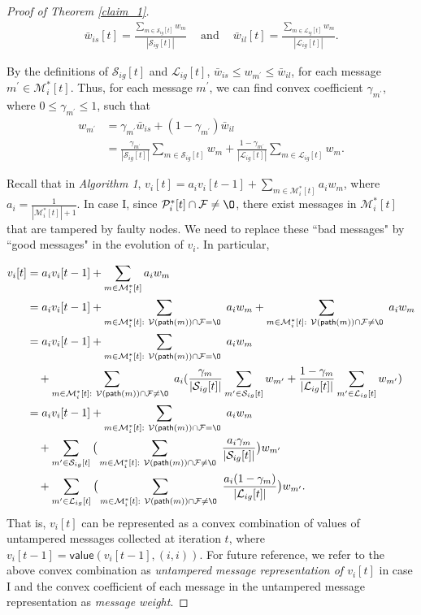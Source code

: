 \documentclass[letterpaper, 11pt]{article}
\newcommand{\calF}{{\mathcal{F}}}
\newcommand{\calL}{{\mathcal{L}}}
\newcommand{\calM}{{\mathcal{M}}}
\newcommand{\calP}{{\mathcal{P}}}
\newcommand{\calS}{{\mathcal{S}}}
\newcommand{\calV}{{\mathcal{V}}}
\begin{document}
\begin{proof}[Proof of Theorem \ref{claim_1}]
\begin{eqnarray}
\bar{w}_{is}[t]=\frac{\sum_{m\in \calS_{ig}[t]}w_{m}}{|\calS_{ig}[t]|} \quad ~ \text{and}~\quad
\bar{w}_{il}[t]=\frac{\sum_{m\in \calL_{ig}[t]}w_{m}}{|\calL_{ig}[t]|}.
\end{eqnarray}




By the definitions of $\calS_{ig}[t]$ and $\calL_{ig}[t]$, $\bar{w}_{is}\le w_{m^{\prime}}\le \bar{w}_{il}$, for each message $m^{\prime}\in \calM^*_i[t]$. Thus, for each message $m^{\prime}$, we can find convex coefficient $\gamma_{m^{\prime}}$, where $0\le \gamma_{m^{\prime}} \le 1$, such that
\begin{align*}
w_{m^{\prime}}&=\gamma_{m^{\prime}}\bar{w}_{is}+(1-\gamma_{m^{\prime}})\bar{w}_{il}\\
&=\frac{\gamma_{m^{\prime}}}{|\calS_{ig}[t]|}\sum_{m\in \calS_{ig}[t]}w_m+\frac{1-\gamma_{m^{\prime}}}{|\calL_{ig}[t]|}\sum_{m\in \calL_{ig}[t]}w_m.
\end{align*}

Recall that in \emph {Algorithm 1}, $v_i[t]=a_iv_i[t-1]+\sum_{m\in \calM_i^*[t]}a_iw_m$, where $a_i=\frac{1}{|\calM_i^*[t]|+1}$. In case I, since $\calP_i^{*}[t]\cap \calF\not=\O$, there exist messages in $\calM_i^{*}[t]$ that are tampered by faulty nodes. We need to replace these ``bad messages" by ``good messages" in the evolution of $v_i$. In particular,

\begin{align}
v_i[t]&=a_iv_i[t-1]+\sum_{m\in \calM_i^*[t]}a_iw_m\\
&=a_iv_i[t-1]+\sum_{m\in \calM_i^*[t]:~\calV(\mathsf{path}(m))\cap \calF=\O~}a_iw_m
+\sum_{m\in \calM_i^*[t]:~ \calV(\mathsf{path}(m))\cap \calF\not=\O~}a_iw_m\\
&=a_iv_i[t-1]+\sum_{m\in \calM_i^*[t]:~  \calV(\mathsf{path}(m))\cap \calF=\O~}a_iw_m\\
&\quad+\sum_{m\in \calM_i^*[t]:~\calV(\mathsf{path}(m))\cap \calF\not=\O~}a_i(\frac{\gamma_{m}}{|\calS_{ig}[t]|}\sum_{m^{\prime}\in \calS_{ig}[t]}w_{m^{\prime}}+\frac{1-\gamma_{m}}{|\calL_{ig}[t]|}\sum_{m^{\prime}\in \calL_{ig}[t]}w_{m^{\prime}})\\
&=a_iv_i[t-1]+\sum_{m\in \calM_i^*[t]:~ \calV(\mathsf{path}(m))\cap \calF=\O~}a_iw_m\\
&\quad+\sum_{m^{\prime}\in \calS_{ig}[t]}\big{(}\sum_{m\in \calM_i^*[t]:~ \calV(\mathsf{path}(m))\cap \calF\not=\O~}\frac{a_i\gamma_m}{|\calS_{ig}[t]|} \big{)}w_{m^{\prime}}\\
&\quad+\sum_{m^{\prime}\in \calL_{ig}[t]}\big{(}\sum_{m\in \calM_i^*[t]:~ \calV(\mathsf{path}(m))\cap \calF\not=\O~}\frac{a_i(1-\gamma_m)}{|\calL_{ig}[t]|} \big{)}w_{m^{\prime}}.
\end{align}
That is, $v_i[t]$ can be represented as a convex combination of values of untampered messages collected at iteration $t$, where $v_i[t-1]=\mathsf{value}(v_i[t-1], (i, i))$.
For future reference, we refer to the above convex combination as \emph{untampered message representation of $v_i[t]$} in case I and the convex coefficient of each message in the untampered message representation as \emph{message weight}.


\end{proof}
\end{document}
